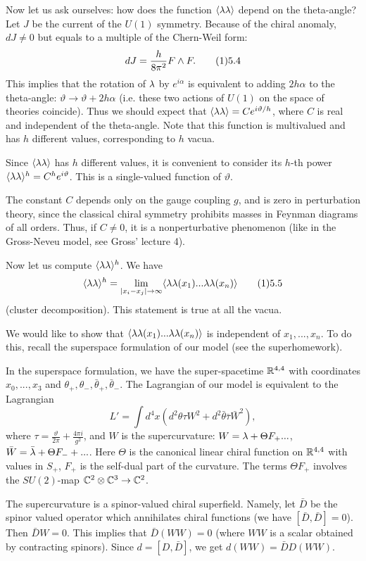 Now let us ask ourselves: how does the function $\langle\lambda\lambda\rangle$ depend on the 
theta-angle? Let $J$ be the current of the $U(1)$ symmetry. Because 
of the chiral anomaly, $dJ\ne 0$ but equals to a multiple 
of the Chern-Weil form: 
$$
dJ=\frac{h}{8\pi^2}F\wedge F.\tag 15.4
$$
This implies that the rotation of $\lambda$ by $e^{i\alpha}$ is equivalent to 
adding $2h\alpha$ to the theta-angle: $\vartheta\to\vartheta+2h\alpha$
(i.e. these two actions of $U(1)$ on the space of theories coincide). 
Thus we should expect that $\langle\lambda\lambda\rangle=Ce^{i\vartheta/h}$, where $C$ is real
and independent of the theta-angle. Note that this function is 
multivalued and has $h$ different values, corresponding to $h$ vacua.  

Since $\langle\lambda\lambda\rangle$ has $h$ different values, it is convenient 
to consider its $h$-th power $\langle\lambda\lambda\rangle^h=C^he^{i\vartheta}$. This is a 
single-valued function of $\vartheta$. 

The constant $C$ depends only on the gauge coupling $g$, and is zero 
in perturbation theory, since the classical chiral symmetry prohibits masses 
in Feynman diagrams of all orders. Thus, if $C\ne 0$, it is a nonperturbative 
phenomenon (like in the Gross-Neveu model, see Gross' lecture 4).

Now let us compute $\langle\lambda\lambda\rangle^h$. We have 
$$
\<\l\l\>^h=\lim_{|x_i-x_j|\to \infty}\<\l\l(x_1)...\l\l(x_n)\>\tag 15.5
$$
(cluster decomposition). This statement is true at all the vacua. 

We would like to show that $\langle\lambda\lambda(x_1)...\lambda\lambda(x_n)\rangle$
 is independent of $x_1,...,x_n$. 
To do this, recall the superspace formulation of our model
(see the superhomework). 

In the superspace formulation, we have the super-spacetime 
$\Bbb R^{4,4}$ with coordinates $x_0,...,x_3$ and 
$\theta_+,\theta_-,\bar\theta_+,\bar\theta_-$. 
The Lagrangian of our model is equivalent to the Lagrangian 
$$
L'=\int d^4x (d^2\theta \tau W^2+d^2\bar\theta \bar\tau\bar W^2), 
$$
where $\tau=\frac{\vartheta}{2\pi}+\frac{4\pi i}{g^2}$, and $W$ is the 
supercurvature: $W=\lambda+\Theta F_+...$,
$\bar W=\bar{\lambda}+\Theta F_-+...$. Here $\Theta$ is the canonical 
linear chiral function on $\Bbb R^{4,4}$ with values in $S_+$, 
$F_+$ is the self-dual part of the curvature.
The terms $\Theta F_+$ involves the $SU(2)$-map $\Bbb C^2\otimes \Bbb C^3\to \Bbb C^2$. 

The supercurvature is a spinor-valued chiral superfield. Namely, let $\bar D$ 
be the spinor valued operator which annihilates chiral functions
(we have $[\bar D,\bar D]=0$). 
Then $\bar D W=0$. This implies that $\bar D(WW)=0$ (where $WW$ is a scalar
obtained by contracting spinors). Since $d=[D,\bar D]$, we get 
$d(WW)=\bar D D(WW)$. 

